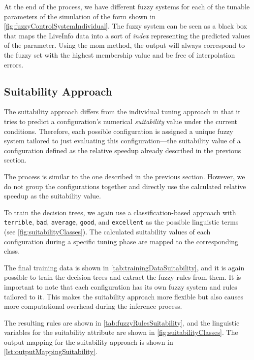 At the end of the process, we have different fuzzy systems for each of the tunable parameters of the simulation of the form shown in \autoref{fig:fuzzyControlSystemIndividual}. The fuzzy system can be seen as a black box that maps the LiveInfo data into a sort of \emph{index} representing the predicted values of the parameter. Using the \gls{mom} method, the output will always correspond to the fuzzy set with the highest membership value and be free of interpolation errors.


\subsection{Suitability Approach}

The suitability approach differs from the individual tuning approach in that it tries to predict a configuration's numerical \emph{suitability} value under the current conditions. Therefore, each possible configuration is assigned a unique fuzzy system tailored to just evaluating this configuration—the suitability value of a configuration defined as the relative speedup already described in the previous section.

The process is similar to the one described in the previous section. However, we do not group the configurations together and directly use the calculated relative speedup as the suitability value.

To train the decision trees, we again use a classification-based approach with \texttt{terrible}, \texttt{bad}, \texttt{average}, \texttt{good}, and \texttt{excellent} as the possible linguistic terms (see \autoref{fig:suitabilityClasses}). The calculated suitability values of each configuration during a specific tuning phase are mapped to the corresponding class.

The final training data is shown in \autoref{tab:trainingDataSuitability}, and it is again possible to train the decision trees and extract the fuzzy rules from them. It is important to note that each configuration has its own fuzzy system and rules tailored to it. This makes the suitability approach more flexible but also causes more computational overhead during the inference process.

The resulting rules are shown in \autoref{tab:fuzzyRulesSuitability}, and the linguistic variables for the suitability attribute are shown in \autoref{fig:suitabilityClasses}. The output mapping for the suitability approach is shown in \autoref{lst:outputMappingSuitability}.

